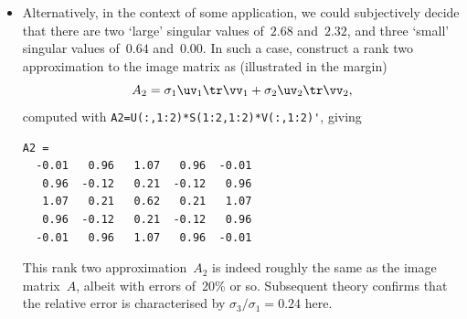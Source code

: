 \begin{example}
\begin{solution}
\begin{itemize}
\item Alternatively, in the context of some application, we could subjectively decide that there are two `large' singular values of~\(2.68\) and~\(2.32\), and three `small' singular values of~\(0.64\) and~\(0.00\).
In such a case, construct a rank two approximation to the image matrix as (illustrated in the margin)
\marginpar{}
\begin{equation*}
A_2=\sigma_1\uv_1\tr\vv_1+\sigma_2\uv_2\tr\vv_2,
\end{equation*}
computed with \verb|A2=U(:,1:2)*S(1:2,1:2)*V(:,1:2)'|, giving \twodp
\begin{verbatim}
A2 =
  -0.01   0.96   1.07   0.96  -0.01
   0.96  -0.12   0.21  -0.12   0.96
   1.07   0.21   0.62   0.21   1.07
   0.96  -0.12   0.21  -0.12   0.96
  -0.01   0.96   1.07   0.96  -0.01
\end{verbatim}
This rank two approximation~\(A_2\) is indeed roughly the same as the image matrix~\(A\), albeit with errors of~20\% or so.
Subsequent theory confirms that the relative error is characterised by \(\sigma_3/\sigma_1=0.24\) here.
\end{itemize}
\end{solution}
\end{example}





